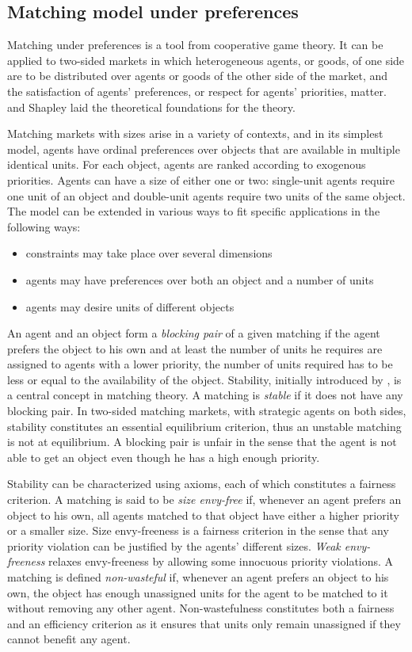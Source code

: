 \subsection{Matching model under preferences}\label{matching-model-under-preferences}%

Matching under preferences is a tool from cooperative game theory.
It can be applied to two-sided markets in which heterogeneous agents, or goods, of one side are to be distributed over agents or goods of the other side of the market, and the satisfaction of agents’ preferences, or respect for agents’ priorities, matter. \citet{gale_1962} and Shapley laid the theoretical foundations for the theory.

Matching markets with sizes arise in a variety of contexts, and in its simplest model, agents have ordinal preferences over objects that are available in multiple identical units. For each object, agents are ranked according to exogenous priorities. Agents can have a size of either one or two: single-unit agents require one unit of an object and double-unit agents require two units of the same object. The model can be extended in various ways to fit specific applications in the following ways:
\begin{itemize}
\item constraints may take place over several dimensions
\item agents may have preferences over both an object and a number of units
\item agents may desire units of different objects
\end{itemize}
An agent and an object form a \textit{blocking pair} of a given matching if the agent prefers the object to his own and at least the number of units he requires are assigned to agents with a lower priority, the number of units required has to be less or equal to the availability of the object. Stability, initially introduced by \citet{gale_1962}, is a central concept in matching theory. A matching is \textit{stable} if it does not have any blocking pair. In two-sided matching markets, with strategic agents on both sides, stability constitutes an essential equilibrium criterion, thus an unstable matching is not at equilibrium. A blocking pair is unfair in the sense that the agent is not able to get an object even though he has a high enough priority.

Stability can be characterized using axioms, each of which constitutes a fairness criterion. A matching is said to be \textit{size envy-free} if, whenever an agent prefers an object to his own, all agents matched to that object have either a higher priority or a smaller size. Size envy-freeness is a fairness criterion in the sense that any priority violation can be justified by the agents' different sizes. \textit{Weak envy-freeness} relaxes envy-freeness by allowing some innocuous priority violations. A matching is defined \textit{non-wasteful} if, whenever an agent prefers an object to his own, the object has enough unassigned units for the agent to be matched to it without removing any other agent. Non-wastefulness constitutes both a fairness and an efficiency criterion as it ensures that units only remain unassigned if they cannot benefit any agent.

